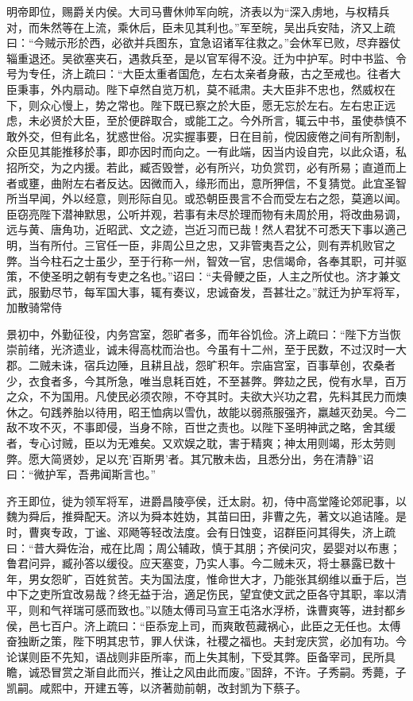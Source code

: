 \documentclass[12pt,UTF8]{ctexbook}
\begin{document}
明帝即位，赐爵关内侯。大司马曹休帅军向皖，济表以为“深入虏地，与权精兵对，而朱然等在上流，乘休后，臣未见其利也。”军至皖，吴出兵安陆，济又上疏曰：“今贼示形於西，必欲并兵图东，宜急诏诸军往救之。”会休军已败，尽弃器仗辎重退还。吴欲塞夹石，遇救兵至，是以官军得不没。迁为中护军。时中书监、令号为专任，济上疏曰：“大臣太重者国危，左右太亲者身蔽，古之至戒也。往者大臣秉事，外内扇动。陛下卓然自览万机，莫不祗肃。夫大臣非不忠也，然威权在下，则众心慢上，势之常也。陛下既已察之於大臣，愿无忘於左右。左右忠正远虑，未必贤於大臣，至於便辟取合，或能工之。今外所言，辄云中书，虽使恭慎不敢外交，但有此名，犹惑世俗。况实握事要，日在目前，傥因疲倦之间有所割制，众臣见其能推移於事，即亦因时而向之。一有此端，因当内设自完，以此众语，私招所交，为之内援。若此，臧否毁誉，必有所兴，功负赏罚，必有所易；直道而上者或壅，曲附左右者反达。因微而入，缘形而出，意所狎信，不复猜觉。此宜圣智所当早闻，外以经意，则形际自见。或恐朝臣畏言不合而受左右之怨，莫適以闻。臣窃亮陛下潜神默思，公听并观，若事有未尽於理而物有未周於用，将改曲易调，远与黄、唐角功，近昭武、文之迹，岂近习而已哉！然人君犹不可悉天下事以適己明，当有所付。三官任一臣，非周公旦之忠，又非管夷吾之公，则有弄机败官之弊。当今柱石之士虽少，至于行称一州，智效一官，忠信竭命，各奉其职，可并驱策，不使圣明之朝有专吏之名也。”诏曰：“夫骨鲠之臣，人主之所仗也。济才兼文武，服勤尽节，每军国大事，辄有奏议，忠诚奋发，吾甚壮之。”就迁为护军将军，加散骑常侍

景初中，外勤征役，内务宫室，怨旷者多，而年谷饥俭。济上疏曰：“陛下方当恢崇前绪，光济遗业，诚未得高枕而治也。今虽有十二州，至于民数，不过汉时一大郡。二贼未诛，宿兵边陲，且耕且战，怨旷积年。宗庙宫室，百事草创，农桑者少，衣食者多，今其所急，唯当息耗百姓，不至甚弊。弊攰之民，傥有水旱，百万之众，不为国用。凡使民必须农隙，不夺其时。夫欲大兴功之君，先料其民力而燠休之。句践养胎以待用，昭王恤病以雪仇，故能以弱燕服强齐，羸越灭劲吴。今二敌不攻不灭，不事即侵，当身不除，百世之责也。以陛下圣明神武之略，舍其缓者，专心讨贼，臣以为无难矣。又欢娱之耽，害于精爽；神太用则竭，形太劳则弊。愿大简贤妙，足以充'百斯男'者。其冗散未齿，且悉分出，务在清静”诏曰：“微护军，吾弗闻斯言也。”

齐王即位，徙为领军将军，进爵昌陵亭侯，迁太尉。初，侍中高堂隆论郊祀事，以魏为舜后，推舜配天。济以为舜本姓妫，其苗曰田，非曹之先，著文以追诘隆。是时，曹爽专政，丁谧、邓飏等轻改法度。会有日蚀变，诏群臣问其得失，济上疏曰：“昔大舜佐治，戒在比周；周公辅政，慎于其朋；齐侯问灾，晏婴对以布惠；鲁君问异，臧孙答以缓役。应天塞变，乃实人事。今二贼未灭，将士暴露已数十年，男女怨旷，百姓贫苦。夫为国法度，惟命世大才，乃能张其纲维以垂于后，岂中下之吏所宜改易哉？终无益于治，適足伤民，望宜使文武之臣各守其职，率以清平，则和气祥瑞可感而致也。”以随太傅司马宣王屯洛水浮桥，诛曹爽等，进封都乡侯，邑七百户。济上疏曰：“臣忝宠上司，而爽敢苞藏祸心，此臣之无任也。太傅奋独断之策，陛下明其忠节，罪人伏诛，社稷之福也。夫封宠庆赏，必加有功。今论谋则臣不先知，语战则非臣所率，而上失其制，下受其弊。臣备宰司，民所具瞻，诚恐冒赏之渐自此而兴，推让之风由此而废。”固辞，不许。子秀嗣。秀薨，子凯嗣。咸熙中，开建五等，以济著勋前朝，改封凯为下蔡子。
\end{document}
